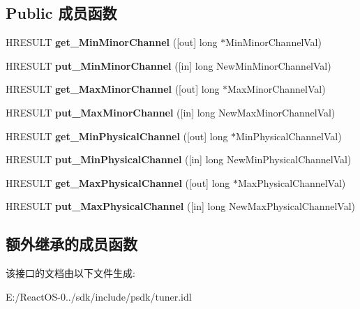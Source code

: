 \subsection*{Public 成员函数}
\begin{DoxyCompactItemize}
\item 
\mbox{\label{interface_i_a_t_s_c_tuning_space_a1fb05bb29a57bec1a22085fae4e1f6b7}} 
H\+R\+E\+S\+U\+LT {\bfseries get\+\_\+\+Min\+Minor\+Channel} (\mbox{[}out\mbox{]} long $\ast$Min\+Minor\+Channel\+Val)
\item 
\mbox{\label{interface_i_a_t_s_c_tuning_space_ab83ebb7db33d7f8b728bd81ca708079d}} 
H\+R\+E\+S\+U\+LT {\bfseries put\+\_\+\+Min\+Minor\+Channel} (\mbox{[}in\mbox{]} long New\+Min\+Minor\+Channel\+Val)
\item 
\mbox{\label{interface_i_a_t_s_c_tuning_space_a54ac92261b037538de4b8383aaec4241}} 
H\+R\+E\+S\+U\+LT {\bfseries get\+\_\+\+Max\+Minor\+Channel} (\mbox{[}out\mbox{]} long $\ast$Max\+Minor\+Channel\+Val)
\item 
\mbox{\label{interface_i_a_t_s_c_tuning_space_abad0b56510034c0370fcb744c084a6ae}} 
H\+R\+E\+S\+U\+LT {\bfseries put\+\_\+\+Max\+Minor\+Channel} (\mbox{[}in\mbox{]} long New\+Max\+Minor\+Channel\+Val)
\item 
\mbox{\label{interface_i_a_t_s_c_tuning_space_ac10411ef0696082d783a65a2440928ad}} 
H\+R\+E\+S\+U\+LT {\bfseries get\+\_\+\+Min\+Physical\+Channel} (\mbox{[}out\mbox{]} long $\ast$Min\+Physical\+Channel\+Val)
\item 
\mbox{\label{interface_i_a_t_s_c_tuning_space_ab85cfd92efc5d1467f76f908758284b5}} 
H\+R\+E\+S\+U\+LT {\bfseries put\+\_\+\+Min\+Physical\+Channel} (\mbox{[}in\mbox{]} long New\+Min\+Physical\+Channel\+Val)
\item 
\mbox{\label{interface_i_a_t_s_c_tuning_space_aa38f0f75892720f5fcf376d28412455a}} 
H\+R\+E\+S\+U\+LT {\bfseries get\+\_\+\+Max\+Physical\+Channel} (\mbox{[}out\mbox{]} long $\ast$Max\+Physical\+Channel\+Val)
\item 
\mbox{\label{interface_i_a_t_s_c_tuning_space_a9c0aab9d831d1926801d5366793861f6}} 
H\+R\+E\+S\+U\+LT {\bfseries put\+\_\+\+Max\+Physical\+Channel} (\mbox{[}in\mbox{]} long New\+Max\+Physical\+Channel\+Val)
\end{DoxyCompactItemize}
\subsection*{额外继承的成员函数}


该接口的文档由以下文件生成\+:\begin{DoxyCompactItemize}
\item 
E\+:/\+React\+O\+S-\/0../sdk/include/psdk/tuner.\+idl\end{DoxyCompactItemize}
